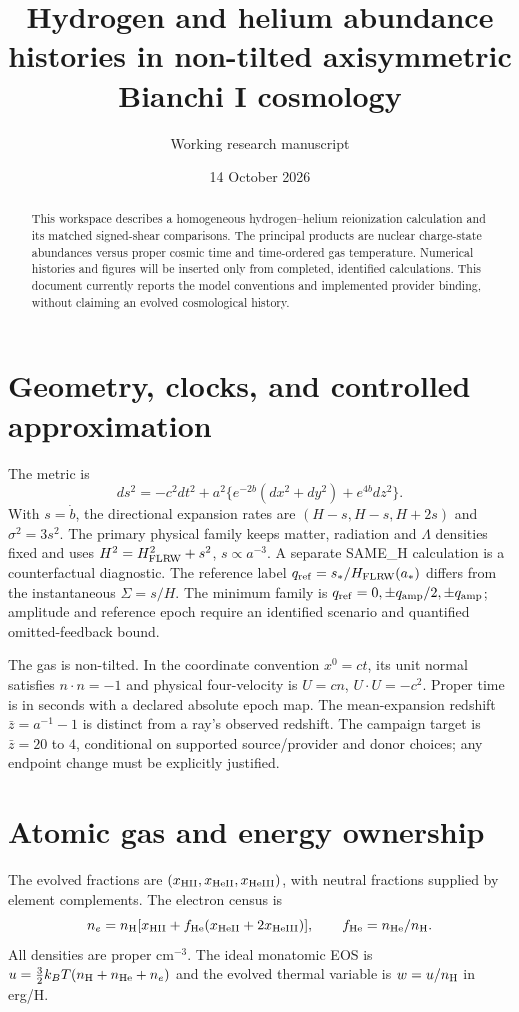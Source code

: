 \documentclass[11pt]{article}
\title{Hydrogen and helium abundance histories in non-tilted axisymmetric Bianchi I cosmology}
\author{Working research manuscript}
\date{14 October 2026}
\begin{document}
\maketitle
\begin{abstract}
This workspace describes a homogeneous hydrogen--helium reionization calculation and its matched signed-shear comparisons. The principal products are nuclear charge-state abundances versus proper cosmic time and time-ordered gas temperature. Numerical histories and figures will be inserted only from completed, identified calculations. This document currently reports the model conventions and implemented provider binding, without claiming an evolved cosmological history.
\end{abstract}
\section{Geometry, clocks, and controlled approximation}
The metric is
\begin{equation}
 ds^2=-c^2dt^2+a^2\{e^{-2b}(dx^2+dy^2)+e^{4b}dz^2\}.
\end{equation}
With $s=\dot b$, the directional expansion rates are $(H-s,H-s,H+2s)$ and $\sigma^2=3s^2$. The primary physical family keeps matter, radiation and $\Lambda$ densities fixed and uses $H^2=H_{\rm FLRW}^2+s^2$, $s\propto a^{-3}$. A separate SAME\_H calculation is a counterfactual diagnostic. The reference label $q_{\rm ref}=s_*/H_{\rm FLRW}(a_*)$ differs from the instantaneous $\Sigma=s/H$. The minimum family is $q_{\rm ref}=0,\pm q_{\rm amp}/2,\pm q_{\rm amp}$; amplitude and reference epoch require an identified scenario and quantified omitted-feedback bound.

The gas is non-tilted. In the coordinate convention $x^0=ct$, its unit normal satisfies $n\cdot n=-1$ and physical four-velocity is $U=cn$, $U\cdot U=-c^2$. Proper time is in seconds with a declared absolute epoch map. The mean-expansion redshift $\bar z=a^{-1}-1$ is distinct from a ray's observed redshift. The campaign target is $\bar z=20$ to $4$, conditional on supported source/provider and donor choices; any endpoint change must be explicitly justified.

\section{Atomic gas and energy ownership}
The evolved fractions are $(x_{\rm HII},x_{\rm HeII},x_{\rm HeIII})$, with neutral fractions supplied by element complements. The electron census is
\begin{equation}
 n_e=n_{\rm H}[x_{\rm HII}+f_{\rm He}(x_{\rm HeII}+2x_{\rm HeIII})],\qquad f_{\rm He}=n_{\rm He}/n_{\rm H}.
\end{equation}
All densities are proper $\mathrm{cm}^{-3}$. The ideal monatomic EOS is $u=\frac32 k_BT(n_{\rm H}+n_{\rm He}+n_e)$ and the evolved thermal variable is $w=u/n_{\rm H}$ in erg/H.
\end{document}
